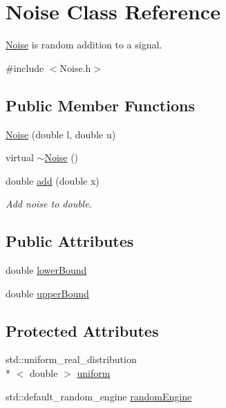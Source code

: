 \hypertarget{class_noise}{\section{Noise Class Reference}
\label{class_noise}
}


\hyperlink{class_noise}{Noise} is random addition to a signal.  




{\ttfamily \#include $<$Noise.\-h$>$}

\subsection*{Public Member Functions}
\begin{DoxyCompactItemize}
\item 
\hyperlink{class_noise_ace14f0bb8c81fb41a3c3f8baf860c4b5}{Noise} (double l, double u)
\item 
virtual \hyperlink{class_noise_a751f1c229c801b0abd4a84f8bf08d810}{$\sim$\-Noise} ()
\item 
double \hyperlink{class_noise_a2d93027a479f2b41a9e80919563a6f97}{add} (double x)
\begin{DoxyCompactList}\small\item\em Add noise to double. \end{DoxyCompactList}\end{DoxyCompactItemize}
\subsection*{Public Attributes}
\begin{DoxyCompactItemize}
\item 
double \hyperlink{class_noise_aea68fa84d28eb99d85078f97e8b5c232}{lower\-Bound}
\item 
double \hyperlink{class_noise_ae4e9a84fa020eac595826a7a9a95bcb6}{upper\-Bound}
\end{DoxyCompactItemize}
\subsection*{Protected Attributes}
\begin{DoxyCompactItemize}
\item 
std\-::uniform\-\_\-real\-\_\-distribution\\*
$<$ double $>$ \hyperlink{class_noise_aa7025a1f6193c8cf2ce4d225b9f9413f}{uniform}
\item 
std\-::default\-\_\-random\-\_\-engine \hyperlink{class_noise_ac334ce93af290c25bb835780c3d25018}{random\-Engine}
\end{DoxyCompactItemize}


